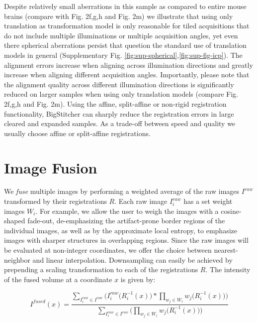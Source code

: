 Despite relatively small aberrations in this sample as compared to entire mouse brains (compare with Fig. 2f,g,h and Fig. 2m) we illustrate that using only translation as transformation model is only reasonable for tiled acquisitions that do not include multiple illuminations or multiple acquisition angles, yet even there spherical aberrations persist that question the standard use of translation models in general (Supplementary Fig. \ref{fig:sup-spherical},\ref{fig:sup-fig-icp}). The alignment errors increase when aligning across illumination directions and greatly increase when aligning different acquisition angles. Importantly, please note that the alignment quality across different illumination directions is significantly reduced on larger samples when using only translation models (compare Fig. 2f,g,h and Fig. 2m). Using the affine, split-affine or non-rigid registration functionality, BigStitcher can sharply reduce the registration errors in large cleared and expanded samples. As a trade-off between speed and quality we usually choose affine or split-affine registrations.

\section{Image Fusion}
\label{sec:fusion}

We \emph{fuse} multiple images by performing a weighted average of the raw images $I^{raw}$ transformed by their registrations $R$. Each raw image $I^{raw}_i$ has a set weight images $W_i$. For example, we allow the user to weigh the images with a cosine-shaped fade-out, de-emphasizing the artifact-prone border regions of the individual images, as well as by the approximate local entropy, to emphasize images with sharper structures in overlapping regions. Since the raw images will be evaluated at non-integer coordinates, we offer the choice between nearest-neighbor and linear interpolation. Downsampling can easily be achieved by prepending a scaling transformation to each of the registrations $R$. The intensity of the fused volume at a coordinate $x$ is given by:

\begin{equation}
\label{eq:fusion-eq1}
I^{fused}(x) ={ \frac{  \sum_{ I^{raw}_i \in I^{raw}} \Big(I^{raw}_i\big(R_i^{-1}(x)\big) * \prod_{w_j \in W_i}{w_j\big(R_i^{-1}(x)\big)\Big)}}{ \sum_{I^{raw}_i \in I^{raw}}\Big( \prod_{w_j \in W_i}{w_j\big(R_i^{-1}(x)\big)\Big)}}}
\end{equation}

